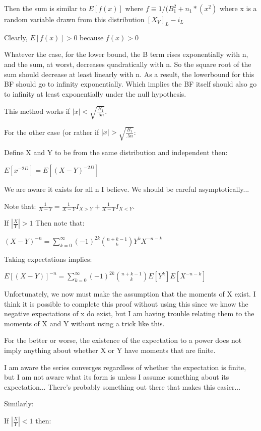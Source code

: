 \documentclass[11pt]{article}
\begin{document}
Then the sum is similar to $E[f(x)]$ where $f \equiv 1 / (B_1^2 + n_1*(x^2)$ where x is a random variable drawn from this distribution $[X_V]_{L} - i_L$

Clearly, $E[f(x)] > 0$ because $f(x) > 0$

Whatever the case, for the lower bound, the B term rises exponentially with n, and the sum, at worst, decreases quadratically with n. So the square root of the sum should decrease at least linearly with n. As a result, the lowerbound for this BF should go to infinity exponentially. Which implies the BF itself should also go to infinity at least exponentially under the null hypothesis.

This method works if $|x| < \sqrt{\frac{B_1}{.5n}} $. 

For the other case (or rather if $|x| > \sqrt{\frac{B_1}{.5n}} $:

Define X and Y to be from the same distribution and independent then:

$E[x^{-2D}] = E[(X-Y)^{-2D}]$

We are aware it exists for all n I believe. We should be careful asymptotically...

Note that: $\frac{1}{X-Y} = \frac{1}{X-Y} I_{X > Y} + \frac{1}{X-Y} I_{X < Y}$. 

If $|\frac{X}  {Y} | > 1$ Then note that:

$(X - Y)^{-n} = \sum_{k=0}^{\infty} (-1)^{2k} \binom{n+k-1}{k}{Y^k}{X^{-n-k}}$

Taking expectations implies:

$E[(X - Y)]^{-n} = \sum_{k=0}^{\infty} (-1)^{2k} \binom{n+k-1}{k}E[{Y^k}]E[{X^{-n-k}}]$

Unfortunately, we now must make the assumption that the moments of X exist. I think it is possible to complete this proof without using this since we know the negative expectations of x do exist, but I am having trouble relating them to the moments of X and Y without using a trick like this.

For the better or worse, the existence of the expectation to a power does not imply anything about whether X or Y have moments that are finite.

I am aware the series converges regardless of whether the expectation is finite, but I am not aware what its form is unless I assume something about its expectation... There's probably something out there that makes this easier...

Similarly:

If $|\frac{X}  {Y} | < 1$ then:
\end{document}
